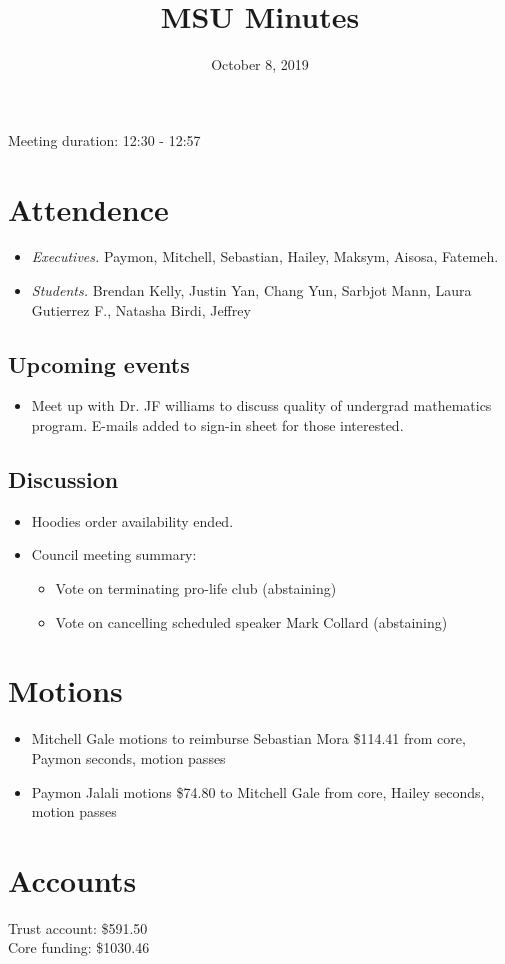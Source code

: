 \documentclass[12pt]{article}
\title{MSU Minutes}
\date{October 8, 2019}
\begin{document}
\maketitle

Meeting duration: 12:30 - 12:57

\section*{Attendence}
\begin{itemize}
\item \textit{Executives.} Paymon, Mitchell, Sebastian, Hailey, Maksym, Aisosa, Fatemeh.
\item \textit{Students.} Brendan Kelly, Justin Yan, Chang Yun, Sarbjot Mann, Laura Gutierrez F., Natasha Birdi, Jeffrey
\end{itemize}

\subsection*{Upcoming events}
\begin{itemize}
\item Meet up with Dr. JF williams to discuss quality of undergrad mathematics program. E-mails added to sign-in sheet for those interested.
\end{itemize}

\subsection*{Discussion}
\begin{itemize}
\item Hoodies order availability ended.
\item Council meeting summary:
  \begin{itemize}
  \item Vote on terminating pro-life club (abstaining)
  \item Vote on cancelling scheduled speaker Mark Collard (abstaining)
  \end{itemize}
\end{itemize}

\section*{Motions}
\begin{itemize}
\item Mitchell Gale motions to reimburse Sebastian Mora \$114.41 from core, Paymon seconds, motion passes
\item Paymon Jalali motions \$74.80 to Mitchell Gale from core, Hailey seconds, motion passes
\end{itemize}

\section*{Accounts}

Trust account: \$591.50 \\
Core funding: \$1030.46 \\
\end{document}
